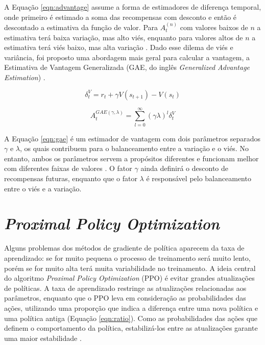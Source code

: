 A Equação \ref{eqn:advantage} assume a forma de estimadores de diferença temporal, onde primeiro é estimado a soma das recompensas com desconto e então é descontado a estimativa da função de valor. Para $A_{t}^{(n)}$ com valores baixos de $n$ a estimativa terá baixa variação, mas alto viés, enquanto para valores altos de $n$ a estimativa terá viés baixo, mas alta variação \cite{seita}. Dado esse dilema de viés e variância, foi proposto uma abordagem mais geral para calcular a vantagem, a Estimativa de Vantagem Generalizada (GAE, do inglês \textit{Generalized Advantage Estimation}) \cite{Schulman16}.

\begin{equation}
\label{eqn:temporaldiscount}
\delta^{V}_{t} = r_{t} + \gamma V(s_{t+1}) - V(s_{t})
\end{equation}

\begin{equation}
\label{eqn:gae}
A_{t}^{GAE(\gamma, \lambda)} = \sum_{l=0}^{\infty} \left(\gamma\lambda\right)^{l}\delta^{V}_{t}
\end{equation}

A Equação \ref{eqn:gae} é um estimador de vantagem com dois parâmetros separados $\gamma$ e $\lambda$, os quais contribuem para o balanceamento entre a variação e o viés. No entanto, ambos os parâmetros servem a propósitos diferentes e funcionam melhor com diferentes faixas de valores \cite{Schulman16}. O fator $\gamma$ ainda definirá o desconto de recompensas futuras, enquanto que o fator $\lambda$ é responsável pelo balanceamento entre o viés e a variação.


\section{\textit{Proximal Policy Optimization}}
\label{section:ppoalg}

Alguns problemas dos métodos de gradiente de política aparecem da taxa de aprendizado: se for muito pequena o processo de treinamento será muito lento, porém se for muito alta terá muita variabilidade no treinamento. A ideia central do algoritmo \textit{Proximal Policy Optimization} (PPO) \cite{Schulman17} é evitar grandes atualizações de políticas. A taxa de aprendizado restringe as atualizações relacionadas aos parâmetros, enquanto que o PPO leva em consideração as probabilidades das ações, utilizando uma proporção que indica a diferença entre uma nova política e uma política antiga (Equação \ref{eqn:ratio}). Como as probabilidades das ações que definem o comportamento da política, estabilizá-los entre as atualizações garante uma maior estabilidade \cite{Schulman15}. 

